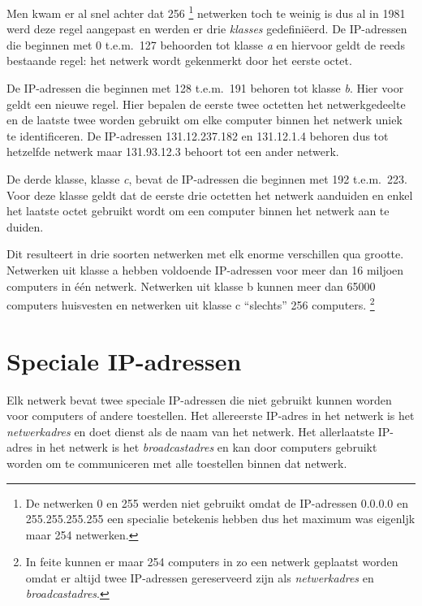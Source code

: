 Men kwam er al snel achter dat 256%
   \footnote{De netwerken 0 en 255 werden niet gebruikt omdat de IP-adressen 0.0.0.0 en 255.255.255.255 een specialie betekenis hebben dus het maximum was eigenljk maar 254 netwerken.}
netwerken toch te weinig is dus al in 1981 werd deze regel aangepast en werden er drie \emph{klasses} gedefiniëerd.
De IP-adressen die beginnen met 0 t.e.m.~127 behoorden tot klasse \emph{a} en hiervoor geldt de reeds bestaande regel: het netwerk wordt gekenmerkt door het eerste octet.

De IP-adressen die beginnen met 128 t.e.m.~191 behoren tot klasse \emph{b}. Hier voor geldt een nieuwe regel.
Hier bepalen de eerste twee octetten het netwerkgedeelte en de laatste twee worden gebruikt om elke computer binnen het netwerk uniek te identificeren.
De IP-adressen 131.12.237.182 en 131.12.1.4 behoren dus tot hetzelfde netwerk maar 131.93.12.3 behoort tot een ander netwerk.

De derde klasse, klasse \emph{c}, bevat de IP-adressen die beginnen met 192 t.e.m.~223.
Voor deze klasse geldt dat de eerste drie octetten het netwerk aanduiden en enkel het laatste octet gebruikt wordt om een computer binnen het netwerk aan te duiden.

Dit resulteert in drie soorten netwerken met elk enorme verschillen qua grootte.
Netwerken uit klasse a hebben voldoende IP-adressen voor meer dan 16 miljoen computers in één netwerk.
Netwerken uit klasse b kunnen meer dan \num{65000} computers huisvesten en netwerken uit klasse c ``slechts'' 256 computers.%
   \footnote{In feite kunnen er maar 254 computers in zo een netwerk geplaatst worden omdat er altijd twee IP-adressen gereserveerd zijn als \emph{netwerkadres} en \emph{broadcastadres}.}



\section{Speciale IP-adressen}
\label{sec:speciale-ip-adressen}

Elk netwerk bevat twee speciale IP-adressen die niet gebruikt kunnen worden voor computers of andere toestellen.
Het allereerste IP-adres in het netwerk is het \emph{netwerkadres} en doet dienst als de naam van het netwerk.
Het allerlaatste IP-adres in het netwerk is het \emph{broadcastadres} en kan door computers gebruikt worden om te communiceren met alle toestellen binnen dat netwerk.





